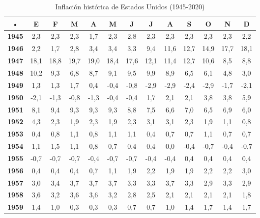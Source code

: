 \begin{center}
\begin{footnotesize}
\begin{longtable}{|c|c|c|c|c|c|c|c|c|c|c|c|c|}
\caption{Inflación histórica de Estados Unidos (1945-2020)}
\label{tab:inflacion-eeuu}\\
\hline 
• & \textbf{E} & \textbf{F} & \textbf{M} & \textbf{A} & \textbf{M} & \textbf{J} & \textbf{J} & \textbf{A} & \textbf{S} & \textbf{O} & \textbf{N} & \textbf{D} \\ 
\hline 
\textbf{1945} & 2,3 & 2,3 & 2,3 & 1,7 & 2,3 & 2,8 & 2,3 & 2,3 & 2,3 & 2,3 & 2,3 & 2,2  \\ 
\hline 
\textbf{1946} & 2,2 & 1,7 & 2,8 & 3,4 & 3,4 & 3,3 & 9,4 & 11,6 & 12,7 & 14,9 & 17,7 & 18,1  \\ 
\hline 
\textbf{1947} & 18,1 & 18,8 & 19,7 & 19,0 & 18,4 & 17,6 & 12,1 & 11,4 & 12,7 & 10,6 & 8,5 & 8,8  \\ 
\hline 
\textbf{1948} & 10,2 & 9,3 & 6,8 & 8,7 & 9,1 & 9,5 & 9,9 & 8,9 & 6,5 & 6,1 & 4,8 & 3,0  \\ 
\hline 
\textbf{1949} & 1,3 & 1,3 & 1,7 & 0,4 & -0,4 & -0,8 & -2,9 & -2,9 & -2,4 & -2,9 & -1,7 & -2,1  \\ 
\hline 
\textbf{1950} & -2,1 & -1,3 & -0,8 & -1,3 & -0,4 & -0,4 & 1,7 & 2,1 & 2,1 & 3,8 & 3,8 & 5,9  \\ 
\hline 
\textbf{1951} & 8,1 & 9,4 & 9,3 & 9,3 & 9,3 & 8,8 & 7,5 & 6,6 & 7,0 & 6,5 & 6,9 & 6,0  \\ 
\hline 
\textbf{1952} & 4,3 & 2,3 & 1,9 & 2,3 & 1,9 & 2,3 & 3,1 & 3,1 & 2,3 & 1,9 & 1,1 & 0,8  \\ 
\hline 
\textbf{1953} & 0,4 & 0,8 & 1,1 & 0,8 & 1,1 & 1,1 & 0,4 & 0,7 & 0,7 & 1,1 & 0,7 & 0,7  \\ 
\hline 
\textbf{1954} & 1,1 & 1,5 & 1,1 & 0,8 & 0,7 & 0,4 & 0,4 & 0,0 & -0,4 & -0,7 & -0,4 & -0,7  \\ 
\hline 
\textbf{1955} & -0,7 & -0,7 & -0,7 & -0,4 & -0,7 & -0,7 & -0,4 & -0,4 & 0,4 & 0,4 & 0,4 & 0,4  \\ 
\hline 
\textbf{1956} & 0,4 & 0,4 & 0,4 & 0,7 & 1,1 & 1,9 & 2,2 & 1,9 & 1,9 & 2,2 & 2,2 & 3,0  \\ 
\hline 
\textbf{1957} & 3,0 & 3,4 & 3,7 & 3,7 & 3,7 & 3,3 & 3,3 & 3,7 & 3,3 & 2,9 & 3,3 & 2,9  \\ 
\hline 
\textbf{1958} & 3,6 & 3,2 & 3,6 & 3,6 & 3,2 & 2,8 & 2,5 & 2,1 & 2,1 & 2,1 & 2,1 & 1,8  \\ 
\hline 
\textbf{1959} & 1,4 & 1,0 & 0,3 & 0,3 & 0,3 & 0,7 & 0,7 & 1,0 & 1,4 & 1,7 & 1,4 & 1,7  \\ 

\end{longtable}
\end{footnotesize}
\end{center}

